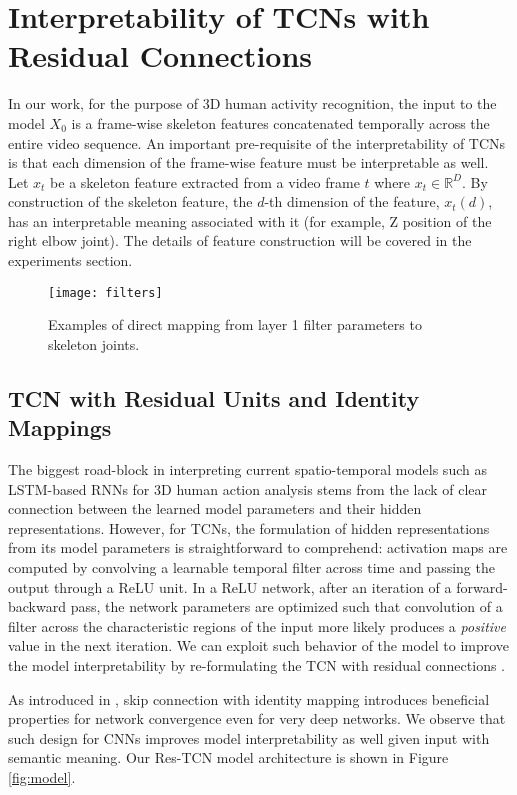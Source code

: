 \documentclass[10pt,twocolumn,letterpaper]{article}
\begin{document}
\section{Interpretability of TCNs with Residual Connections}

In our work, for the purpose of 3D human activity recognition, the input to the model $X_0$ is a frame-wise skeleton features concatenated temporally across the entire video sequence. An important pre-requisite of the interpretability of TCNs is that each dimension of the frame-wise feature must be interpretable as well. Let $x_t$ be a skeleton feature extracted from a video frame $t$ where $x_t \in \mathbb{R}^{D}$. By construction of the skeleton feature, the $d$-th dimension of the feature, $x_t(d)$, has an interpretable meaning associated with it (for example, Z position of the right elbow joint). The details of feature construction will be covered in the experiments section. 


\begin{figure*}
\begin{center}
 \texttt{[image: filters]}
\end{center}
 \caption{Examples of direct mapping from layer 1 filter parameters to skeleton joints.}
\label{fig:filter}
\end{figure*}

\subsection{TCN with Residual Units and Identity Mappings}
The biggest road-block in interpreting current spatio-temporal models such as LSTM-based RNNs for 3D human action analysis stems from the lack of clear connection between the learned model parameters and their hidden representations. However, for TCNs, the formulation of hidden representations from its model parameters is straightforward to comprehend: activation maps are computed by convolving a learnable temporal filter across time and passing the output through a ReLU unit. In a ReLU network, after an iteration of a forward-backward pass, the network parameters are optimized such that convolution of a filter across the characteristic regions of the input more likely produces a \textit{positive} value in the next iteration. We can exploit such behavior of the model to improve the model interpretability by re-formulating the TCN with residual connections \cite{resnet}.

As introduced in \cite{resnet}, skip connection with identity mapping introduces beneficial properties for network convergence even for very deep networks. We observe that such design for CNNs improves model interpretability as well given input with semantic meaning. Our Res-TCN model architecture is shown in Figure \ref{fig:model}. 
\end{document}
